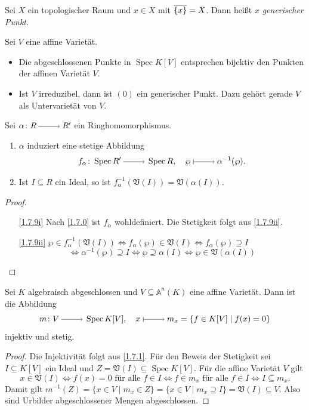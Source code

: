 \documentclass[a4paper,12pt]{scrbook}
\theoremstyle{keinenummern} %
\theoremstyle{mitnummern}
\theoremstyle{unserbeweis}
\newtheorem{proof}{Beweis}
\def\A{\mathbb{A}}
\def\V{\mathfrak{V}}
\newcommand{\Spec}{\operatorname{Spec}}
\newcommand{\ra}{\raisebox{-1pt}{\tikz{\draw[thin,shorten >=3pt, ->] (0,0) node{\hspace*{-2pt}} -- node{} (1,0);}}\penalty1000\relax}
\renewcommand{\mapsto}{\raisebox{-1pt}{\tikz{\draw[thin,shorten >=3pt, |->] (0,0) node{\hspace*{0pt}} -- node{} (1,0);}}\penalty1000\relax}
\def\Bar#1{\ensuremath\overline{#1}}
\begin{document}
\begin{bem}\label{1.7.7}
  Sei $X$ ein topologischer Raum und $x\in X$ mit $\Bar{\{x\}}=X$. Dann heißt $x$ \emph{generischer Punkt}.
\end{bem}

\begin{bsp}\label{1.7.8}
  Sei $V$ eine affine Varietät.
  \begin{itemize}
  \item Die abgeschlossenen Punkte in $\Spec K[V]$ entsprechen bijektiv den Punkten der affinen Varietät $V$.
  \item Ist $V$ irreduzibel, dann ist $(0)$ ein generischer Punkt. Dazu gehört gerade $V$ als Untervarietät von $V$.
  \end{itemize}
\end{bsp}


\begin{bem}\label{1.7.9}
  Sei $\alpha\colon R\ra R'$ ein Ringhomomorphismus.
  \begin{enumerate}
  \item{} $\alpha$ induziert eine stetige Abbildung \[ f_\alpha\colon \Spec R'\ra\Spec R,\quad
    \wp\mapsto\alpha^{-1}(\wp). \]
  \item{} Ist $I\subseteq R$ ein Ideal, so ist $f_\alpha^{-1}(\V(I))=\V(\alpha(I))$.
  \end{enumerate}
\end{bem}
\begin{proof}
  \begin{enumerate}
  \item[\ref{1.7.9i}] Nach \cref{1.7.0} ist $f_\alpha$ wohldefiniert. Die Stetigkeit folgt aus \ref{1.7.9ii}.
  \item[\ref{1.7.9ii}]
      $\wp\in f_\alpha^{-1}(\V(I)) \iff f_\alpha(\wp)\in\V(I) \iff f_\alpha(\wp)\supseteq I$%
      \[\iff \alpha^{-1}(\wp)\supseteq I \iff \wp\supseteq\alpha(I) \iff \wp\in\V(\alpha(I))\]
  \end{enumerate}
\end{proof}

\begin{prop}\label{1.7.10}
  Sei $K$ algebraisch abgeschlossen und $V\subseteq\A^n(K)$ eine affine Varietät. Dann ist die Abbildung
  \[ m\colon V\ra \Spec K[V], \quad x\mapsto m_x=\{f\in K[V]\mid f(x)=0\} \]
  injektiv und stetig.
\end{prop}
\begin{proof}
  Die Injektivität folgt aus \cref{1.7.1}. Für den Beweis der Stetigkeit sei $I\subseteq K[V]$ ein Ideal und
  $Z=\V(I)\subseteq\Spec K[V]$. Für die affine
  Varietät $V$ gilt
  \[x\in\V(I) \iff f(x)=0 \text{ für alle }f\in I \iff f\in m_x \text{ für alle }f\in I \iff I\subseteq m_x. \]
  Damit gilt $m^{-1}(Z)=\{x\in V\mid m_x\in Z\}=\{x\in V\mid m_x\supseteq I\}=\V(I)\subseteq V$. Also sind Urbilder
  abgeschlossener Mengen abgeschlossen.
\end{proof}
\end{document}
